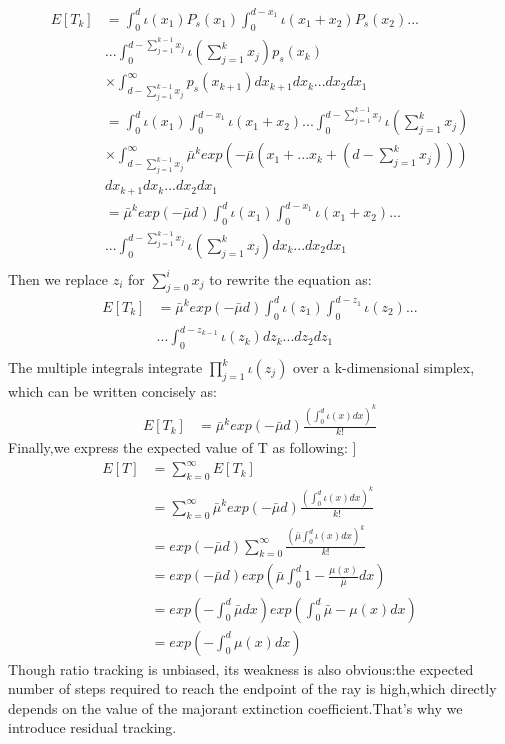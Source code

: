 \documentclass[acmtog]{acmart}
\begin{document}
\begin{equation}
	\begin{aligned}
		E[T_k] &= \int_{0}^{d}\iota(x_1) P_s(x_1)\int_{0}^{d-x_1}\iota(x_1+x_2) P_s(x_2)...\\&...
		\int_{0}^{d-\sum_{j=1}^{k-1}x_j}\iota (\sum_{j=1}^{k}x_j)p_s(x_k)\\
		&\times\int_{d-\sum_{j=1}^{k-1}x_j}^{\infty}p_s(x_{k+1})dx_{k+1}dx_k...dx_2dx_1\\
		&=\int_{0}^{d}\iota(x_1)\int_{0}^{d-x_1}\iota(x_1+x_2)...\int_{0}^{d-\sum_{j=1}^{k-1}x_j}\iota (\sum_{j=1}^{k}x_j) \\
		&\times\int_{d-\sum_{j=1}^{k-1}x_j}^{\infty}\bar{\mu}^kexp(-\bar{\mu}(x_1+...x_k+(d-\sum_{j=1}^{k}x_j)))\\&dx_{k+1}dx_k...dx_2dx_1\\
		&=\bar{\mu}^kexp(-\bar{\mu}d)\int_{0}^{d}\iota(x_1)\int_{0}^{d-x_1}\iota(x_1+x_2)...\\
		&...\int_{0}^{d-\sum_{j=1}^{k-1}x_j}\iota (\sum_{j=1}^{k}x_j)dx_k...dx_2dx_1\\
	\end{aligned}
\end{equation}
Then we replace $z_i$ for $\sum_{j=0}^{i}x_j$ to rewrite the equation as:
\begin{equation}
	\begin{aligned}
		E[T_k]&=\bar{\mu}^kexp(-\bar{\mu}d)\int_{0}^{d}\iota(z_1)\int_{0}^{d-z_1}\iota(z_2)...\\
		&...\int_{0}^{d-z_{k-1}}\iota (z_k)dz_k...dz_2dz_1\\
	\end{aligned}
\end{equation}
The multiple integrals integrate $\prod_{j=1}^{k}\iota(z_j) $ over a k-dimensional simplex, which can be written concisely as:
\begin{equation}
	\begin{aligned}
		E[T_k]&=\bar{\mu}^kexp(-\bar{\mu}d)\frac{(\int_{0}^{d}\iota(x)dx)^k}{k!}
	\end{aligned}
\end{equation}
Finally,we express the expected value of T as following:
]\begin{equation}
	\begin{aligned}
		E[T]&=\sum_{k=0}^{\infty}E[T_k]\\
			&=\sum_{k=0}^{\infty}\bar{\mu}^kexp(-\bar{\mu}d)\frac{(\int_{0}^{d}\iota(x)dx)^k}{k!}\\
			&=exp(-\bar{\mu}d)\sum_{k=0}^{\infty}\frac{(\bar{\mu}\int_{0}^{d}\iota(x)dx)^k}{k!}\\
			&=exp(-\bar{\mu}d)exp(\bar{\mu}\int_{0}^{d}1-\frac{\mu(x)}{\bar{\mu}}dx)\\
			&=exp(-\int_{0}^{d}\bar{\mu}dx)exp(\int_{0}^{d}\bar{\mu}-\mu(x)dx)\\
			&=exp(-\int_{0}^{d}{\mu}(x)dx)
	\end{aligned}
\end{equation}
Though ratio tracking is unbiased, its weakness is also obvious:the expected number of steps required to reach the endpoint of the ray is high,which directly depends on the value of the majorant extinction coefficient.That's why we introduce residual tracking.
\end{document}
